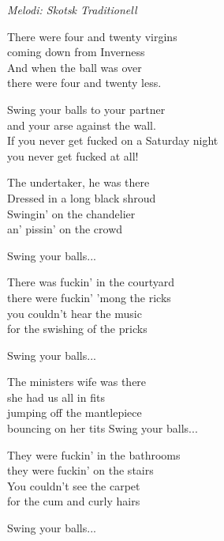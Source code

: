 {\footnotesize\textit{Melodi: Skotsk Traditionell}}\par
\vspace{10pt}
There were four and twenty virgins\\
coming down from Inverness\\
And when the ball was over\\
there were four and twenty less.\par
\vspace{10pt}
Swing your balls to your partner\\
and your arse against the wall.\\
If you never get fucked on a Saturday night\\
you never get fucked at all!\par
\vspace{10pt}
The undertaker, he was there\\
Dressed in a long black shroud\\
Swingin' on the chandelier\\
an' pissin' on the crowd\par
\vspace{10pt}
Swing your balls...\par
\vspace{10pt}
There was fuckin' in the courtyard\\
there were fuckin' 'mong the ricks\\
you couldn't hear the music\\
for the swishing of the pricks\par
\vspace{10pt}
Swing your balls...\par
\vspace{10pt}
The ministers wife was there\\
she had us all in fits\\
jumping off the mantlepiece\\
bouncing on her tits
\newpage
Swing your balls...\par
\vspace{10pt}
They were fuckin' in the bathrooms\\
they were fuckin' on the stairs\\
You couldn't see the carpet \\
for the cum and curly hairs\par
\vspace{10pt}
Swing your balls...\par

